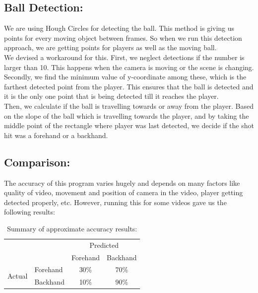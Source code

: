 \documentclass[10.5pt]{proc}
\begin{document}
	\subsection{Ball Detection:}
	We are using Hough Circles for detecting the ball. This method is giving us points for every moving object between frames. So when we run this detection approach, we are getting points for players as well as the moving ball.\\
	We devised a workaround for this. First, we neglect detections if the number is larger than 10. This happens when the camera is moving or the scene is changing. Secondly, we find the minimum value of y-coordinate among these, which is the farthest detected point from the player. This ensures that the ball is detected and it is the only one point that is being detected till it reaches the player.\\
	Then, we calculate if the ball is travelling towards or away from the player. Based on the slope of the ball which is travelling towards the player, and by taking the middle point of the rectangle where player was last detected, we decide if the shot hit was a forehand or a backhand.\\
	
	
	
	\subsection{Comparison:}
	The accuracy of this program varies hugely and depends on many factors like quality of video, movement and position of camera in the video, player getting detected properly, etc. However, running this for some videos gave us the following results:
	\begin{table}[h]
	\caption{Summary of approximate accuracy results:}
	\begin{tabular}{ll|c|c|}
	\cline{3-4}
	                                              &          & \multicolumn{2}{c|}{Predicted}                                \\ \cline{3-4} 
	                                              &          & \multicolumn{1}{l|}{Forehand} & \multicolumn{1}{l|}{Backhand} \\ \hline
	\multicolumn{1}{|c|}{\multirow{2}{*}{Actual}} & Forehand & 30\%                          & 70\%                          \\ \cline{2-4} 
	\multicolumn{1}{|c|}{}                        & Backhand & 10\%                          & 90\%                          \\ \hline
	\end{tabular}
	\end{table}
\end{document}
